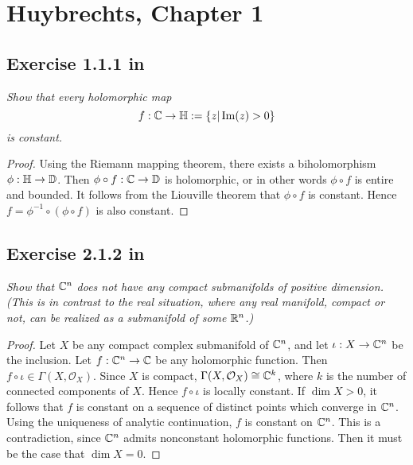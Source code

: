 \documentclass{article}
\begin{document}
\section{Huybrechts, Chapter 1}

\subsection*{Exercise 1.1.1 in \cite{Huy}}
\textit{Show that every holomorphic map}
\[	f : \mathbb{C} \to \mathbb{H} : = \{z | \operatorname{Im} (z) > 0	\}	\]
\textit{is constant.}
\begin{proof}
Using the Riemann mapping theorem, there exists a biholomorphism $\phi :\mathbb{H} \to \mathbb{D}$. Then
$\phi \circ f : \mathbb{C} \to \mathbb{D}$ is holomorphic, or in other words $\phi \circ f$ is entire and bounded.
It follows from the Liouville theorem that $\phi \circ f$ is constant. Hence $f = \phi^{-1} \circ
(\phi \circ f)$ is also constant.
\end{proof}

\subsection*{Exercise 2.1.2 in \cite{Huy}}
\textit{Show that} $\mathbb{C}^n$ \textit{does not have any compact submanifolds of positive dimension. (This
is in contrast to the real situation, where any real manifold, compact or not, can be realized as
a submanifold of some} $\mathbb{R}^n$\textit{.)}
\begin{proof}
Let $X$ be any compact complex submanifold of $\mathbb{C}^n$, and let $\iota:X \to \mathbb{C}^n$ be the inclusion.
Let $f:\mathbb{C}^n \to \mathbb{C}$ be any holomorphic function. Then $f \circ \iota \in \Gamma(X,\mathcal{O}_X)$. Since
$X$ is compact, $\Gamma(X,\mathcal{O}_X) \cong \mathbb{C}^k$, where $k$ is the number of connected components of
$X$. Hence $f\circ \iota$ is locally constant. If $\dim X >0$, it follows that $f$ is constant on a sequence
of distinct points which converge in $\mathbb{C}^n$. Using the uniqueness of analytic continuation, $f$ is constant on $\mathbb{C}^n$.
This is a contradiction, since $\mathbb{C}^n$ admits nonconstant holomorphic functions. Then it must be the case that
$\dim X = 0$.
\end{proof}
\end{document}
